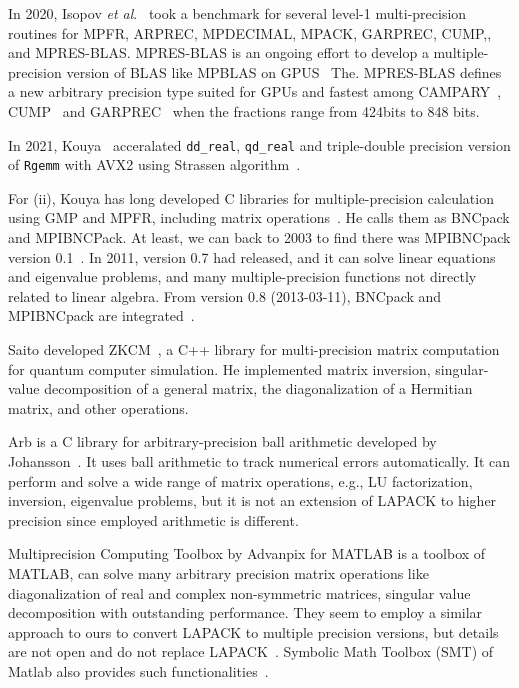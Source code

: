 \documentclass[12pt]{article}
\newcommand{\etal}{\textit{et al}.}
\begin{document}
In 2020, Isopov \etal{}~\cite{ISUPOV2020105506} took a benchmark for several level-1 multi-precision routines for MPFR, ARPREC, MPDECIMAL, MPACK, GARPREC, CUMP,, and MPRES-BLAS. MPRES-BLAS is an ongoing effort to develop a multiple-precision version of BLAS like MPBLAS on GPUS~ The\cite{10.1007/978-3-030-64616-5_4}. MPRES-BLAS defines a new arbitrary precision type suited for GPUs and fastest among CAMPARY~\cite{10.1007/978-3-319-42432-3_29}, CUMP~\cite{Nakayama2011ImplementationOM} and GARPREC~\cite{Lu:2010:SEP:1869389.1869392} when the fractions range from 424bits to 848 bits.

In 2021, Kouya~\cite{10.1007/978-3-030-86976-2_14} acceralated {\tt dd\_real}, {\tt qd\_real} and triple-double precision version of {\tt Rgemm} with AVX2 using Strassen algorithm~\cite{STRASSEN1969}. 

For (ii), Kouya has long developed C libraries for multiple-precision calculation using GMP and MPFR, including matrix operations~\cite{BNCpack}. He calls them as BNCpack and MPIBNCPack. At least, we can back to 2003 to find there was MPIBNCpack version 0.1~\cite{MPIBNCPack01}. In 2011, version 0.7 had released, and it can solve linear equations and eigenvalue problems, and many multiple-precision functions not directly related to linear algebra. From version 0.8 (2013-03-11), BNCpack and MPIBNCpack are integrated~\cite{BNCpack,1710.01839}.

Saito developed ZKCM~\cite{SAITOH20132005}, a C++ library for multi-precision matrix computation for quantum computer simulation. He implemented matrix inversion, singular-value decomposition of a general matrix, the diagonalization of a Hermitian matrix, and other operations.

Arb is a C library for arbitrary-precision ball arithmetic developed by Johansson~\cite{1611.02831}. It uses ball arithmetic to track
numerical errors automatically.  It can perform and solve a wide range of matrix operations, e.g.,  LU factorization, inversion, eigenvalue problems, but it is not an extension of LAPACK to higher precision since employed arithmetic is different. 

Multiprecision Computing Toolbox by Advanpix for MATLAB is a toolbox of MATLAB, can solve many arbitrary precision matrix operations
like diagonalization of real and complex non-symmetric matrices, singular value decomposition with
outstanding performance. They seem to employ a similar approach to ours to convert LAPACK to multiple precision versions, but details are not open and do not replace LAPACK~\cite{advanpix}. Symbolic Math Toolbox (SMT) of Matlab also provides such functionalities~\cite{matlabsymbolic}.
\end{document}
